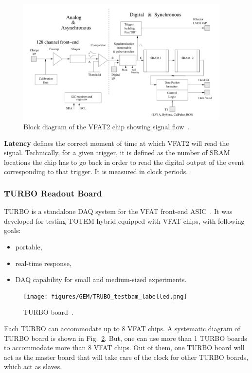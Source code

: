 \begin{figure}[htbp]
    \centering
    \includegraphics[width=0.95\textwidth]{figures/GEM/VFAT2_chip_BlockDiagram.png}
    \caption{Block diagram of the VFAT2 chip showing signal flow~\cite{Aspell2007}.}
    \label{fig:VFAT2block}
\end{figure}



\textbf{Latency} defines the correct moment of time at which VFAT2 will read the signal. Technically, for a given trigger, it is defined as the number of SRAM locations the chip has to go back in order to read the digital output of the event corresponding to that trigger. It is measured in clock periods. 


\subsubsection{TURBO Readout Board} %
\label{ssub:turbo_readout_board}
TURBO is a standalone DAQ system for the VFAT front-end ASIC~\cite{Paschalis2011}. It was developed for testing TOTEM hybrid equipped with VFAT chips, with following goals:
\begin{itemize}
    \item portable,
    \item real-time response,
    \item DAQ capability for small and medium-sized experiments.
\end{itemize}
\begin{figure}[htbp]
    \centering
    \texttt{[image: figures/GEM/TRUBO\_testbam\_labelled.png]}
    \caption{TURBO board~\cite{Paschalis2011}.}
    \label{fig:turbo}
\end{figure}
Each TURBO can accommodate up to 8 VFAT chips. 
A systematic diagram of TURBO board is shown in Fig.~\ref{fig:turbo}. 
But, one can use more than 1 TURBO boards to accommodate more than 8 VFAT chips. 
Out of them, one TURBO board will act as the master board that will take care of the clock for other TURBO boards, which act as slaves.

